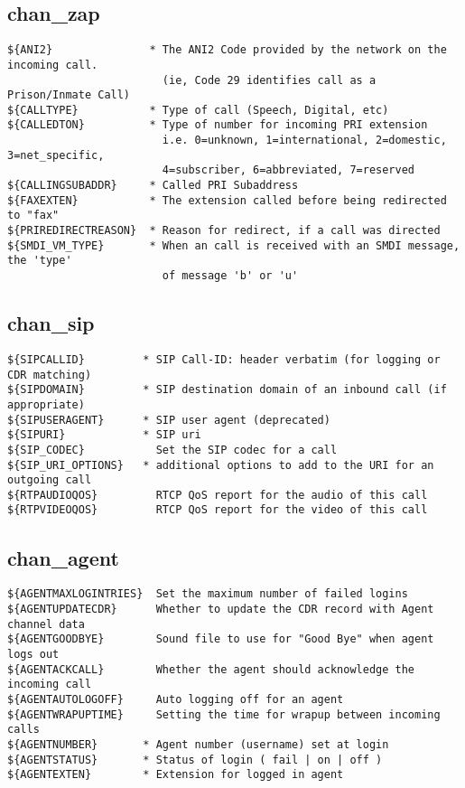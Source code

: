 \subsection{chan\_zap}
\begin{verbatim}
${ANI2}               * The ANI2 Code provided by the network on the incoming call. 
                        (ie, Code 29 identifies call as a Prison/Inmate Call)
${CALLTYPE}           * Type of call (Speech, Digital, etc)
${CALLEDTON}          * Type of number for incoming PRI extension
                        i.e. 0=unknown, 1=international, 2=domestic, 3=net_specific, 
                        4=subscriber, 6=abbreviated, 7=reserved 
${CALLINGSUBADDR}     * Called PRI Subaddress
${FAXEXTEN}           * The extension called before being redirected to "fax" 
${PRIREDIRECTREASON}  * Reason for redirect, if a call was directed
${SMDI_VM_TYPE}       * When an call is received with an SMDI message, the 'type'
                        of message 'b' or 'u'
\end{verbatim}

\subsection{chan\_sip}
\begin{verbatim}
${SIPCALLID}         * SIP Call-ID: header verbatim (for logging or CDR matching)
${SIPDOMAIN}         * SIP destination domain of an inbound call (if appropriate)
${SIPUSERAGENT}      * SIP user agent (deprecated)
${SIPURI}            * SIP uri
${SIP_CODEC}           Set the SIP codec for a call  
${SIP_URI_OPTIONS}   * additional options to add to the URI for an outgoing call
${RTPAUDIOQOS}         RTCP QoS report for the audio of this call
${RTPVIDEOQOS}         RTCP QoS report for the video of this call
\end{verbatim}

\subsection{chan\_agent}
\begin{verbatim}
${AGENTMAXLOGINTRIES}  Set the maximum number of failed logins
${AGENTUPDATECDR}      Whether to update the CDR record with Agent channel data
${AGENTGOODBYE}        Sound file to use for "Good Bye" when agent logs out
${AGENTACKCALL}        Whether the agent should acknowledge the incoming call
${AGENTAUTOLOGOFF}     Auto logging off for an agent
${AGENTWRAPUPTIME}     Setting the time for wrapup between incoming calls
${AGENTNUMBER}       * Agent number (username) set at login
${AGENTSTATUS}       * Status of login ( fail | on | off )
${AGENTEXTEN}        * Extension for logged in agent
\end{verbatim}


